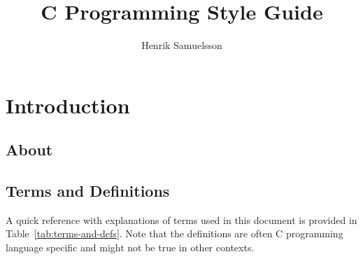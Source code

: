 \documentclass{report}
\title{C Programming Style Guide}
\author{Henrik Samuelsson}
\begin{document}
\maketitle

\tableofcontents
\newpage

\chapter{Introduction}

\section{About}

\section{Terms and Definitions}

A quick reference with explanations of terms used in this document is provided in Table~\ref{tab:terms-and-defs}. Note that the definitions are often C programming language specific and might not be true in other contexts.
\end{document}
